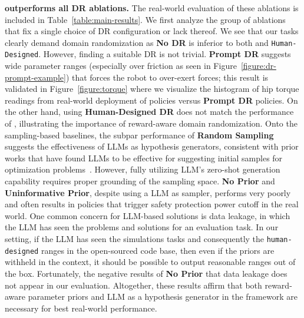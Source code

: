 \documentclass[conference]{IEEEtran}
\begin{document}
\textbf{\ourmethod outperforms all DR ablations.} The real-world evaluation of these ablations is included in Table~\ref{table:main-results}. We first analyze the group of ablations that fix a single choice of DR configuration or lack thereof. We see that our tasks clearly demand domain randomization as \textbf{No DR} is inferior to both \ourmethod and \texttt{Human-Designed}. However, finding a suitable DR is not trivial. \textbf{Prompt DR} suggests wide parameter ranges (especially over friction as seen in Figure~\ref{figure:dr-prompt-example}) that forces the robot to over-exert forces; this result is validated in Figure~\ref{figure:torque} where we visualize the histogram of hip torque readings from real-world deployment of \ourmethod policies versus \textbf{Prompt DR} policies. On the other hand, using \textbf{Human-Designed DR} does not match the performance of \ourmethod, illustrating the importance of reward-aware domain randomization. Onto the sampling-based baselines, the subpar performance of \textbf{Random Sampling} suggests the effectiveness of LLMs as hypothesis generators, consistent with prior works that have found LLMs to be effective for suggesting initial samples for optimization problems~\citep{yang2023large,zhang2023using,anonymous2024large,ma2023eureka,romera2023mathematical}. However, fully utilizing LLM's zero-shot generation capability requires proper grounding of the sampling space. \textbf{No Prior} and \textbf{Uninformative Prior}, despite using a LLM as sampler, performs very poorly and often results in policies that trigger safety protection power cutoff in the real world. One common concern for LLM-based solutions is data leakage, in which the LLM has seen the problems and solutions for an evaluation task. In our setting, if the LLM has seen the simulations tasks and consequently the \texttt{human-designed} ranges in the open-sourced code base, then even if the priors are withheld in the context, it should be possible to output reasonable ranges out of the box. Fortunately, the negative results of \textbf{No Prior}  that data leakage does not appear in our evaluation. Altogether, these results affirm that both reward-aware parameter priors and LLM as a hypothesis generator in the \ourmethod framework are necessary for  best real-world performance. 
\end{document}
